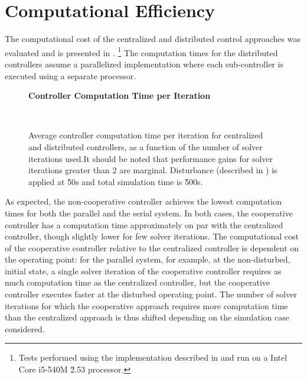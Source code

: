 \section{Computational Efficiency}
\label{sec:results:computation}
\makeplotstrue

The computational cost of the centralized and distributed control approaches was evaluated and is presented in .
\footnote{Tests performed using the \cpp{} implementation described in  and run on a Intel\textregistered{} Core\texttrademark{} i5-540M \u{2.53}{\giga\hertz} processor.} 
The computation times for the distributed controllers assume a parallelized implementation where each sub-controller is executed using a separate processor. 

\ifmakeplots
\begin{figure}
  \centering
  {\large\bfseries Controller Computation Time per Iteration\\}
  \begin{subfigure}{0.75\linewidth}
    
  \end{subfigure}
  \\
  \begin{subfigure}{0.75\linewidth}
    
  \end{subfigure}
  \caption[Controller computation time per iteration.]{Average controller computation time per iteration for centralized and distributed controllers, as a function of the number of solver iterations used.It should be noted that performance gains for solver iterations greater than 2 are marginal. Disturbance (described in ) is applied at \u{50}{s} and total simulation time is \u{500}{s}.}
  \label{fig:results:compcost}
\end{figure}

\fi

As expected, the non-cooperative controller achieves the lowest computation times for both the parallel and the serial system.
In both cases, the cooperative controller has a computation time approximately on par with the centralized controller, though slightly lower for few solver iterations.
The computational cost of the cooperative controller relative to the centralized controller is dependent on the operating point: for the parallel system, for example, at the non-disturbed, initial state, a single solver iteration of the cooperative controller requires as much computation time as the centralized controller, but the cooperative controller executes faster at the disturbed operating point.
The number of solver iterations for which the cooperative approach requires more computation time than the centralized approach is thus shifted depending on the simulation case considered.

